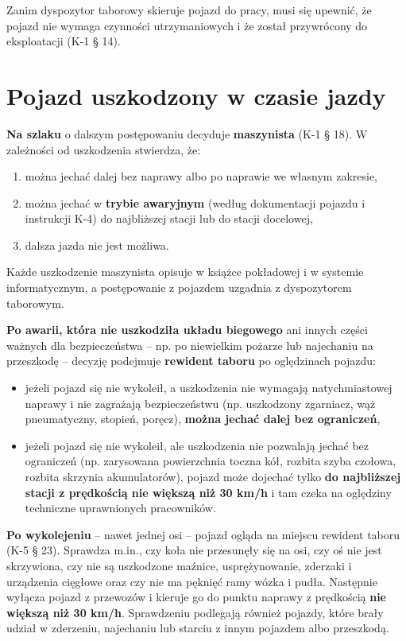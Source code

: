 Zanim dyspozytor taborowy skieruje pojazd do pracy, musi się upewnić, że pojazd nie wymaga czynności utrzymaniowych i że został przywrócony do eksploatacji (K-1 § 14).

\section{Pojazd uszkodzony w czasie jazdy}

\textbf{Na szlaku} o dalszym postępowaniu decyduje \textbf{maszynista} (K-1 § 18). W zależności od uszkodzenia stwierdza, że:
\begin{enumerate}
	\item można jechać dalej bez naprawy albo po naprawie we własnym zakresie,
	\item można jechać w \textbf{trybie awaryjnym} (według dokumentacji pojazdu i instrukcji K-4) do najbliższej stacji lub do stacji docelowej,
	\item dalsza jazda nie jest możliwa.
\end{enumerate}
Każde uszkodzenie maszynista opisuje w książce pokładowej i w systemie informatycznym, a postępowanie z pojazdem uzgadnia z dyspozytorem taborowym.

\textbf{Po awarii, która nie uszkodziła układu biegowego} ani innych części ważnych dla bezpieczeństwa – np. po niewielkim pożarze lub najechaniu na przeszkodę – decyzję podejmuje \textbf{rewident taboru} po oględzinach pojazdu:
\begin{itemize}
	\item jeżeli pojazd się nie wykoleił, a uszkodzenia nie wymagają natychmiastowej naprawy i nie zagrażają bezpieczeństwu (np. uszkodzony zgarniacz, wąż pneumatyczny, stopień, poręcz), \textbf{można jechać dalej bez ograniczeń},
	\item jeżeli pojazd się nie wykoleił, ale uszkodzenia nie pozwalają jechać bez ograniczeń (np. zarysowana powierzchnia toczna kół, rozbita szyba czołowa, rozbita skrzynia akumulatorów), pojazd może dojechać tylko \textbf{do najbliższej stacji z prędkością nie większą niż 30 km/h} i tam czeka na oględziny techniczne uprawnionych pracowników.
\end{itemize}

\textbf{Po wykolejeniu} – nawet jednej osi – pojazd ogląda na miejscu rewident taboru (K-5 § 23). Sprawdza m.in., czy koła nie przesunęły się na osi, czy oś nie jest skrzywiona, czy nie są uszkodzone maźnice, usprężynowanie, zderzaki i urządzenia cięgłowe oraz czy nie ma pęknięć ramy wózka i pudła. Następnie wyłącza pojazd z przewozów i kieruje go do punktu naprawy z prędkością \textbf{nie większą niż 30 km/h}. Sprawdzeniu podlegają również pojazdy, które brały udział w zderzeniu, najechaniu lub starciu z innym pojazdem albo przeszkodą.

